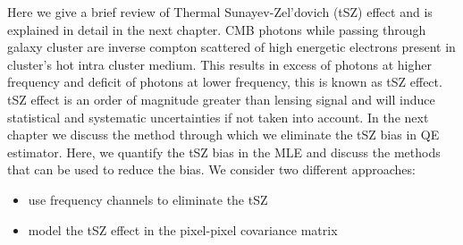 Here we give a brief review of Thermal Sunayev-Zel'dovich (tSZ) effect and is explained in detail in the next chapter.
CMB photons while passing through galaxy cluster are inverse compton scattered of high energetic electrons present in cluster's hot intra cluster medium.
This results in excess of photons at higher frequency and deficit of photons at lower frequency, this is known as tSZ effect.
tSZ effect is an order of magnitude greater than lensing signal and will induce statistical and systematic uncertainties if not taken into account.
In the next chapter we discuss the method through which we eliminate the tSZ bias in QE estimator.
Here, we quantify the tSZ bias in the MLE and discuss the methods that can be used to reduce the bias.
We consider two different approaches:
\begin{itemize}
\item use frequency channels to eliminate the tSZ
\item model the tSZ effect in the pixel-pixel covariance matrix
\end{itemize}



 
   